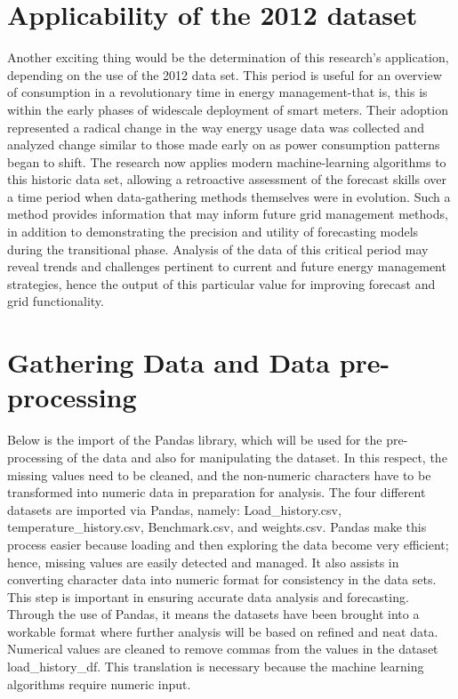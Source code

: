 \documentclass[12pt, a4paper,twoside]{report}
\theoremstyle{plain} %
\theoremstyle{definition} %
\theoremstyle{remark} %
\numberwithin{equation}{chapter}
\begin{document}
\section{Applicability of the 2012 dataset}
Another exciting thing would be the determination of this research's application, depending on the use of the 2012 data set. This period is useful for an overview of consumption in a revolutionary time in energy management-that is, this is within the early phases of widescale deployment of smart meters. Their adoption represented a radical change in the way energy usage data was collected and analyzed change similar to those made early on as power consumption patterns began to shift.
The research now applies modern machine-learning algorithms to this historic data set, allowing a retroactive assessment of the forecast skills over a time period when data-gathering methods themselves were in evolution. Such a method provides information that may inform future grid management methods, in addition to demonstrating the precision and utility of forecasting models during the transitional phase. Analysis of the data of this critical period may reveal trends and challenges pertinent to current and future energy management strategies, hence the output of this particular value for improving forecast and grid functionality.

\section{Gathering Data and Data pre-processing}
\newline
Below is the import of the Pandas library, which will be used for the pre-processing of the data and also for manipulating the dataset. In this respect, the missing values need to be cleaned, and the non-numeric characters have to be transformed into numeric data in preparation for analysis. The four different datasets are imported via Pandas, namely: Load\_history.csv, temperature\_history.csv, Benchmark.csv, and weights.csv.
Pandas make this process easier because loading and then exploring the data become very efficient; hence, missing values are easily detected and managed. It also assists in converting character data into numeric format for consistency in the data sets. This step is important in ensuring accurate data analysis and forecasting. Through the use of Pandas, it means the datasets have been brought into a workable format where further analysis will be based on refined and neat data.
\newline
Numerical values are cleaned to remove commas from the values in the dataset load\_history\_df. This translation is necessary because the machine learning algorithms require numeric input.
\end{document}
